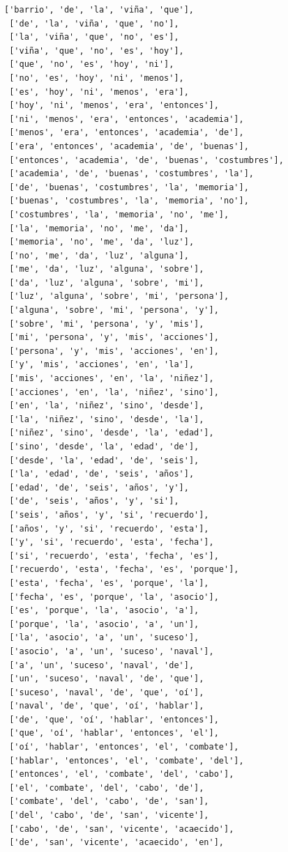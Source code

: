 \documentclass[11pt]{article}
\begin{document}
\begin{tcolorbox}[breakable, size=fbox, boxrule=1pt, pad at break*=1mm,colback=cellbackground, colframe=cellborder]
\begin{Verbatim}[commandchars=\\\{\}]
 ['barrio', 'de', 'la', 'viña', 'que'],
 ['de', 'la', 'viña', 'que', 'no'],
 ['la', 'viña', 'que', 'no', 'es'],
 ['viña', 'que', 'no', 'es', 'hoy'],
 ['que', 'no', 'es', 'hoy', 'ni'],
 ['no', 'es', 'hoy', 'ni', 'menos'],
 ['es', 'hoy', 'ni', 'menos', 'era'],
 ['hoy', 'ni', 'menos', 'era', 'entonces'],
 ['ni', 'menos', 'era', 'entonces', 'academia'],
 ['menos', 'era', 'entonces', 'academia', 'de'],
 ['era', 'entonces', 'academia', 'de', 'buenas'],
 ['entonces', 'academia', 'de', 'buenas', 'costumbres'],
 ['academia', 'de', 'buenas', 'costumbres', 'la'],
 ['de', 'buenas', 'costumbres', 'la', 'memoria'],
 ['buenas', 'costumbres', 'la', 'memoria', 'no'],
 ['costumbres', 'la', 'memoria', 'no', 'me'],
 ['la', 'memoria', 'no', 'me', 'da'],
 ['memoria', 'no', 'me', 'da', 'luz'],
 ['no', 'me', 'da', 'luz', 'alguna'],
 ['me', 'da', 'luz', 'alguna', 'sobre'],
 ['da', 'luz', 'alguna', 'sobre', 'mi'],
 ['luz', 'alguna', 'sobre', 'mi', 'persona'],
 ['alguna', 'sobre', 'mi', 'persona', 'y'],
 ['sobre', 'mi', 'persona', 'y', 'mis'],
 ['mi', 'persona', 'y', 'mis', 'acciones'],
 ['persona', 'y', 'mis', 'acciones', 'en'],
 ['y', 'mis', 'acciones', 'en', 'la'],
 ['mis', 'acciones', 'en', 'la', 'niñez'],
 ['acciones', 'en', 'la', 'niñez', 'sino'],
 ['en', 'la', 'niñez', 'sino', 'desde'],
 ['la', 'niñez', 'sino', 'desde', 'la'],
 ['niñez', 'sino', 'desde', 'la', 'edad'],
 ['sino', 'desde', 'la', 'edad', 'de'],
 ['desde', 'la', 'edad', 'de', 'seis'],
 ['la', 'edad', 'de', 'seis', 'años'],
 ['edad', 'de', 'seis', 'años', 'y'],
 ['de', 'seis', 'años', 'y', 'si'],
 ['seis', 'años', 'y', 'si', 'recuerdo'],
 ['años', 'y', 'si', 'recuerdo', 'esta'],
 ['y', 'si', 'recuerdo', 'esta', 'fecha'],
 ['si', 'recuerdo', 'esta', 'fecha', 'es'],
 ['recuerdo', 'esta', 'fecha', 'es', 'porque'],
 ['esta', 'fecha', 'es', 'porque', 'la'],
 ['fecha', 'es', 'porque', 'la', 'asocio'],
 ['es', 'porque', 'la', 'asocio', 'a'],
 ['porque', 'la', 'asocio', 'a', 'un'],
 ['la', 'asocio', 'a', 'un', 'suceso'],
 ['asocio', 'a', 'un', 'suceso', 'naval'],
 ['a', 'un', 'suceso', 'naval', 'de'],
 ['un', 'suceso', 'naval', 'de', 'que'],
 ['suceso', 'naval', 'de', 'que', 'oí'],
 ['naval', 'de', 'que', 'oí', 'hablar'],
 ['de', 'que', 'oí', 'hablar', 'entonces'],
 ['que', 'oí', 'hablar', 'entonces', 'el'],
 ['oí', 'hablar', 'entonces', 'el', 'combate'],
 ['hablar', 'entonces', 'el', 'combate', 'del'],
 ['entonces', 'el', 'combate', 'del', 'cabo'],
 ['el', 'combate', 'del', 'cabo', 'de'],
 ['combate', 'del', 'cabo', 'de', 'san'],
 ['del', 'cabo', 'de', 'san', 'vicente'],
 ['cabo', 'de', 'san', 'vicente', 'acaecido'],
 ['de', 'san', 'vicente', 'acaecido', 'en'],

\end{Verbatim}
\end{tcolorbox}
\end{document}

